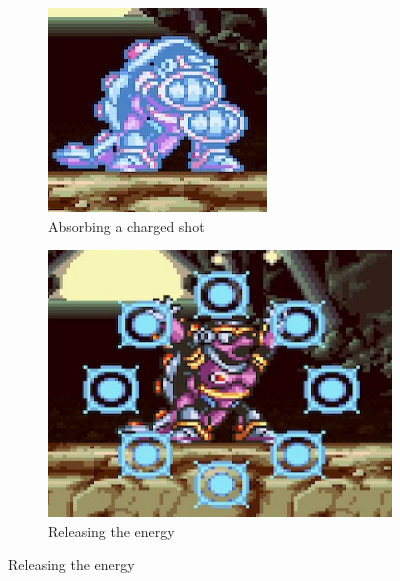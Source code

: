 \begin{figure}[htp]
\begin{subfigure}{0.35\textwidth}
		\includegraphics[width=\linewidth]{figures/X1/Armored_armadillo/Armadillo_energy_1.jpg}
		\caption{Absorbing a charged shot}
	\end{subfigure}
	\begin{subfigure}{0.42\textwidth}
		\centering
		\includegraphics[width=\linewidth]{figures/X1/Armored_armadillo/Armadillo_energy_2.jpg}
		\caption{Releasing the energy}
	\end{subfigure}
\end{figure}
